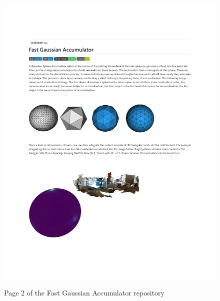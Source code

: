 \begin{figure}[h!]
    \centering\includegraphics[page=2, trim=1.0in 1.0in 1.0in 1.0in, width=.93\linewidth]{appendix_1/imgs/FastGAReadme.pdf}
    \label{fig:apx1_fg2}
    \caption{Page 2 of the Fast Gaussian Accumulator repository} 
\end{figure}

